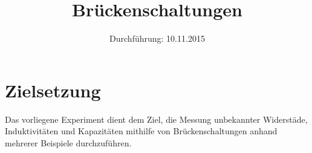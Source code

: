 

\subject{Versuchsprotokoll zum Versuch Nr. 302}
\title{Brückenschaltungen}
\date{
  Durchführung: 10.11.2015
}



\maketitle
\newpage

\section{Zielsetzung}
Das vorliegene Experiment dient dem Ziel, die Messung unbekannter Widerstäde, Induktivitäten und Kapazitäten mithilfe von Brückenschaltungen anhand mehrerer Beispiele durchzuführen.





\printbibliography


